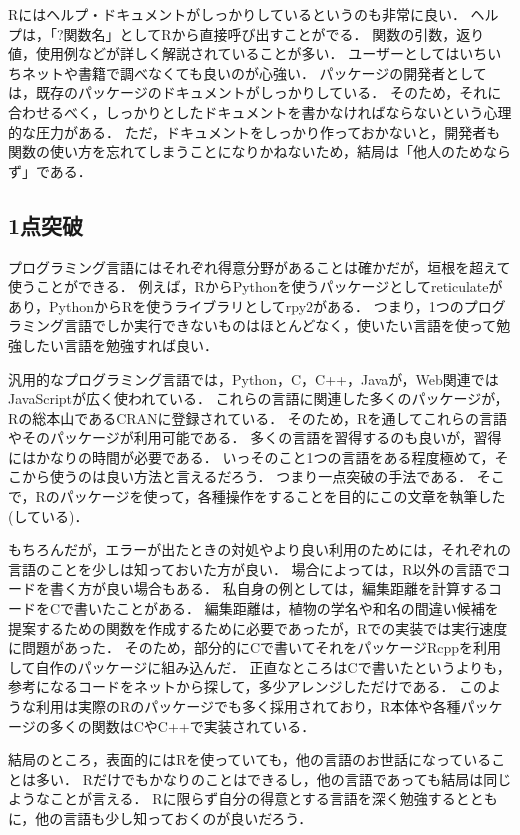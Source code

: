 \documentclass[
]{article}
\begin{document}
Rにはヘルプ・ドキュメントがしっかりしているというのも非常に良い．
ヘルプは，「?関数名」としてRから直接呼び出すことがでる．
関数の引数，返り値，使用例などが詳しく解説されていることが多い．
ユーザーとしてはいちいちネットや書籍で調べなくても良いのが心強い．
パッケージの開発者としては，既存のパッケージのドキュメントがしっかりしている．
そのため，それに合わせるべく，しっかりとしたドキュメントを書かなければならないという心理的な圧力がある．
ただ，ドキュメントをしっかり作っておかないと，開発者も関数の使い方を忘れてしまうことになりかねないため，結局は「他人のためならず」である．

\hypertarget{ux70b9ux7a81ux7834}{%
\subsection{1点突破}\label{ux70b9ux7a81ux7834}}

プログラミング言語にはそれぞれ得意分野があることは確かだが，垣根を超えて使うことができる．
例えば，RからPythonを使うパッケージとしてreticulateがあり，PythonからRを使うライブラリとしてrpy2がある．
つまり，1つのプログラミング言語でしか実行できないものはほとんどなく，使いたい言語を使って勉強したい言語を勉強すれば良い．

汎用的なプログラミング言語では，Python，C，C++，Javaが，Web関連ではJavaScriptが広く使われている．
これらの言語に関連した多くのパッケージが，Rの総本山であるCRANに登録されている．
そのため，Rを通してこれらの言語やそのパッケージが利用可能である．
多くの言語を習得するのも良いが，習得にはかなりの時間が必要である．
いっそのこと1つの言語をある程度極めて，そこから使うのは良い方法と言えるだろう．
つまり一点突破の手法である．
そこで，Rのパッケージを使って，各種操作をすることを目的にこの文章を執筆した(している)．

もちろんだが，エラーが出たときの対処やより良い利用のためには，それぞれの言語のことを少しは知っておいた方が良い．
場合によっては，R以外の言語でコードを書く方が良い場合もある．
私自身の例としては，編集距離を計算するコードをCで書いたことがある．
編集距離は，植物の学名や和名の間違い候補を提案するための関数を作成するために必要であったが，Rでの実装では実行速度に問題があった．
そのため，部分的にCで書いてそれをパッケージRcppを利用して自作のパッケージに組み込んだ．
正直なところはCで書いたというよりも，参考になるコードをネットから探して，多少アレンジしただけである．
このような利用は実際のRのパッケージでも多く採用されており，R本体や各種パッケージの多くの関数はCやC++で実装されている．

結局のところ，表面的にはRを使っていても，他の言語のお世話になっていることは多い．
Rだけでもかなりのことはできるし，他の言語であっても結局は同じようなことが言える．
Rに限らず自分の得意とする言語を深く勉強するとともに，他の言語も少し知っておくのが良いだろう．
\end{document}
